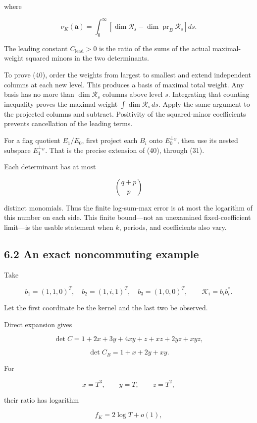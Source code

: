 where

\[
\boxed{
\nu_K(\mathbf a)
=
\int_0^\infty
\left[
\dim\mathscr R_s
-\dim\operatorname{pr}_B\mathscr R_s
\right]ds.
}
\tag{40}
\]

The leading constant \(C_{\mathrm{lead}}>0\) is the ratio of the sums of the actual maximal-weight squared minors in the two determinants.

To prove (40), order the weights from largest to smallest and extend independent columns at each new level. This produces a basis of maximal total weight. Any basis has no more than \(\dim\mathscr R_s\) columns above level \(s\). Integrating that counting inequality proves the maximal weight \(\int\dim\mathscr R_s\,ds\). Apply the same argument to the projected columns and subtract. Positivity of the squared-minor coefficients prevents cancellation of the leading terms.

For a flag quotient \(E_1/E_0\), first project each \(B_i\) onto \(E_0^{\perp_G}\), then use its nested subspace \(E_1^{\perp_G}\). That is the precise extension of (40), through (31).

Each determinant has at most

\[
\binom{q+p}{p}
\]

distinct monomials. Thus the finite log-sum-max error is at most the logarithm of this number on each side. This finite bound---not an unexamined fixed-coefficient limit---is the usable statement when \(k\), periods, and coefficients also vary.

\subsection{6.2 An exact noncommuting example}\label{an-exact-noncommuting-example}

Take

\[
b_1=(1,1,0)^T,\quad
b_2=(1,i,1)^T,\quad
b_3=(1,0,0)^T,
\qquad
\mathcal K_i=b_ib_i^*.
\]

Let the first coordinate be the kernel and the last two be observed.

Direct expansion gives

\[
\det C
=
1+2x+3y+4xy+z+xz+2yz+xyz,
\]

\[
\det C_B=1+x+2y+xy.
\]

For

\[
x=T^3,\qquad y=T,\qquad z=T^2,
\]

their ratio has logarithm

\[
\boxed{f_K=2\log T+o(1),}
\tag{41}
\]

